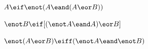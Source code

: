 \begin{earg}
\item $A \eif \enot(A \eand (A \eor B)) $	\vspace{.5ex}	

%
%
%

\item $\enot B \eif [(\enot A \eand A) \eor B]$\vspace{.5ex} 

%

\item $\enot(A \eor B) \eiff (\enot A \eand \enot B)$ \vspace{.5ex}

%


\end{earg}
